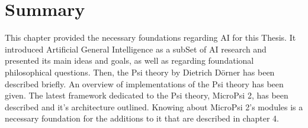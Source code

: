     \section{Summary}
This chapter provided the necessary foundations regarding AI for this Thesis. It introduced Artificial General Intelligence as a subSet of AI research and presented its main ideas and goals, as well as regarding foundational philosophical questions.
Then, the Psi theory by Dietrich Dörner has been described briefly. An overview of implementations of the Psi theory has been given. The latest framework dedicated to the Psi theory, MicroPsi 2, has been described and it's architecture outlined. Knowing about MicroPsi 2's modules is a necessary foundation for the additions to it that are described in chapter 4.

